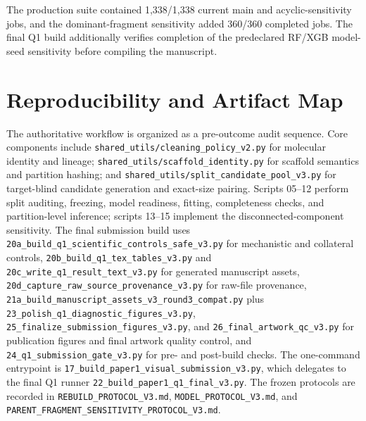 The production suite contained 1,338/1,338 current main and acyclic-sensitivity jobs, and the dominant-fragment sensitivity added 360/360 completed jobs. The final Q1 build additionally verifies completion of the predeclared RF/XGB model-seed sensitivity before compiling the manuscript.



\section{Reproducibility and Artifact Map}
\label{sec:si-repro}

The authoritative workflow is organized as a pre-outcome audit sequence. Core components include \texttt{shared\_utils/cleaning\_policy\_v2.py} for molecular identity and lineage; \texttt{shared\_utils/scaffold\_identity.py} for scaffold semantics and partition hashing; and \texttt{shared\_utils/split\_candidate\_pool\_v3.py} for target-blind candidate generation and exact-size pairing. Scripts 05--12 perform split auditing, freezing, model readiness, fitting, completeness checks, and partition-level inference; scripts 13--15 implement the disconnected-component sensitivity. The final submission build uses \texttt{20a\_build\_q1\_scientific\_controls\_safe\_v3.py} for mechanistic and collateral controls, \texttt{20b\_build\_q1\_tex\_tables\_v3.py} and \texttt{20c\_write\_q1\_result\_text\_v3.py} for generated manuscript assets, \texttt{20d\_capture\_raw\_source\_provenance\_v3.py} for raw-file provenance, \texttt{21a\_build\_manuscript\_assets\_v3\_round3\_compat.py} plus \texttt{23\_polish\_q1\_diagnostic\_figures\_v3.py}, \texttt{25\_finalize\_submission\_figures\_v3.py}, and \texttt{26\_final\_artwork\_qc\_v3.py} for publication figures and final artwork quality control, and \texttt{24\_q1\_submission\_gate\_v3.py} for pre- and post-build checks. The one-command entrypoint is \texttt{17\_build\_paper1\_visual\_submission\_v3.py}, which delegates to the final Q1 runner \texttt{22\_build\_paper1\_q1\_final\_v3.py}. The frozen protocols are recorded in \texttt{REBUILD\_PROTOCOL\_V3.md}, \texttt{MODEL\_PROTOCOL\_V3.md}, and \texttt{PARENT\_FRAGMENT\_SENSITIVITY\_PROTOCOL\_V3.md}.

